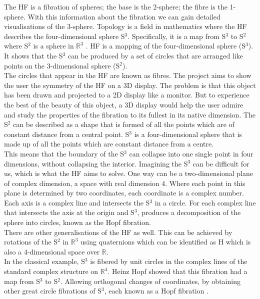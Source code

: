 \documentclass[12pt]{article} %
\begin{document}
\begin{flushleft}
The HF is a fibration of spheres; the base is the 2-sphere; the fibre is the 1-sphere. With this information about the fibration we can gain detailed visualisations of the 3-sphere. Topology is a field in mathematics where the HF describes the four-dimensional sphere S$^{3}$. Specifically, it is a map from S$^{3}$ to S$^{2}$ where S$^{2}$ is a sphere in $\mathbb{R}^{3}$ . HF is a mapping of the four-dimensional sphere (S$^{3}$). It shows that the S$^{3}$ can be produced by a set of circles that are arranged like points on the 3-dimensional sphere (S$^{2}$).\\
The circles that appear in the HF are known as fibres. The project aims to show the user the symmetry of the HF on a 3D display.  The problem is that this object has been drawn and projected to a 2D display like a monitor. But to experience the best of the beauty of this object, a 3D display would help the user admire and study the properties of the fibration to its fullest in its native dimension. The S$^{2}$ can be described as a shape that is formed of all the points which are of constant distance from a central point. S$^{3}$ is a four-dimensional sphere that is made up of all the points which are constant distance from a centre.\\
This means that the boundary of the S$^{3}$ can collapse into one single point in four dimensions, without collapsing the interior. Imagining the S$^{3}$ can be difficult for us, which is what the HF aims to solve. One way can be a two-dimensional plane of complex dimension, a space with real dimension 4. Where each point in this plane is determined by two coordinates, each coordinate is a complex number. Each axis is a complex line and intersects the S$^{3}$ in a circle. For each complex line that intersects the axis at the origin and S$^{3}$, produces a decomposition of the sphere into circles, known as the Hopf fibration.\\
There are other generalisations of the HF as well. This can be achieved by rotations of the S$^{2}$ in $\mathbb{R}^{3}$ using quaternions which can be identified as H which is also a 4-dimensional space over $\mathbb{R}$.\\
In the classical example, S$^{3}$
is fibered by unit circles in the complex
lines of the standard complex structure on $\mathbb{R}^{4}$. Heinz Hopf showed that this fibration had a map from S$^{3}$ to S$^{2}$. Allowing orthogonal
changes of coordinates, by obtaining other great circle fibrations of S$^{3}$,
each known as a Hopf fibration \cite{Gluck:h}.\\

\end{flushleft}
\end{document}
